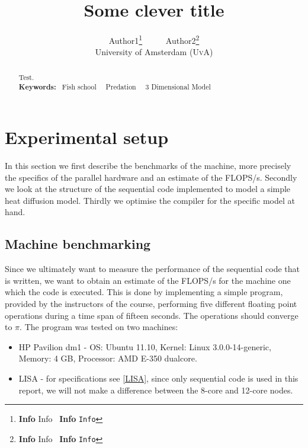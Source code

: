 \documentclass[11pt,a4paper,onecolumn]{article}
\author{Author1\footnote{\textbf{Info} Info \textbar\ \textbf{Info} \texttt{Info}} \ \ \ \ \ Author2\footnote{\textbf{Info} Info \textbar\ \textbf{Info} \texttt{Info}}  \\[15pt] University of Amsterdam (\textsc{UvA})}
\title{Some clever title\\
		}
\begin{document}
\maketitle
\captionsetup{width=0.8\textwidth}
\thispagestyle{empty}

\begin{center}
\begin{abstract}
\small{Test. \\
\textbf{Keywords: } \textbullet\ Fish school \ \textbullet\ Predation \ \textbullet\ 3 Dimensional Model }
\end{abstract}
\end{center}

\newpage
\tableofcontents
\newpage

\section{Experimental setup}
In this section we first describe the benchmarks of the machine, more precisely the specifics of the parallel hardware and an estimate of the FLOPS/s. Secondly we look at the structure of the sequential code implemented to model a simple heat diffusion model. Thirdly we optimise the compiler for the specific model at hand.

\subsection{Machine benchmarking}
Since we ultimately want to measure the performance of the sequential code that is written, we want to obtain an estimate of the FLOPS/s for the machine one which the code is executed. This is done by implementing a simple program, provided by the instructors of the course, performing five different floating point operations during a time span of fifteen seconds. The operations should converge to $\pi$. The program was tested on two machines:

\begin{itemize}
\item 
  HP Pavilion dm1 - OS: Ubuntu 11.10, Kernel: Linux 3.0.0-14-generic, Memory: 4 GB, Processor: AMD E-350 dualcore.
\item
  LISA - for specifications see \ref{LISA}, since only sequential code is used in this report, we will not make a difference between the 8-core and 12-core nodes.
\end{itemize}
\end{document}
